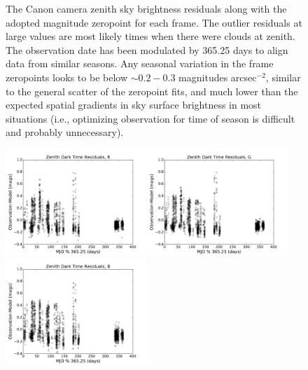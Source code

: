 \documentclass[]{spie}
\begin{document}
\begin{figure}[ht]
\begin{center}
  \end{center}
  \caption{The Canon camera zenith sky brightness residuals along with the adopted magnitude zeropoint for each frame. The outlier residuals at large values are most likely times when there were clouds at zenith.  The observation date has been modulated by 365.25 days to align data from similar seasons.  Any seasonal variation in the frame zeropoints looks to be below $\sim0.2-0.3$ magnitudes arcsec$^{-2}$, similar to the general scatter of the zeropoint fits, and much lower than the expected spatial gradients in sky surface brightness in most situations (i.e., optimizing observation for time of season is difficult and probably unnecessary). \label{fig:timeOfNight}}
\end{figure}

\begin{figure}[ht]
\begin{center}
  \includegraphics[height=4cm]{plots/residTOY_R.pdf}\includegraphics[height=4cm]{plots/residTOY_G.pdf}\includegraphics[height=4cm]{plots/residTOY_B.pdf} \\

\end{center}
\end{figure}
\end{document}
